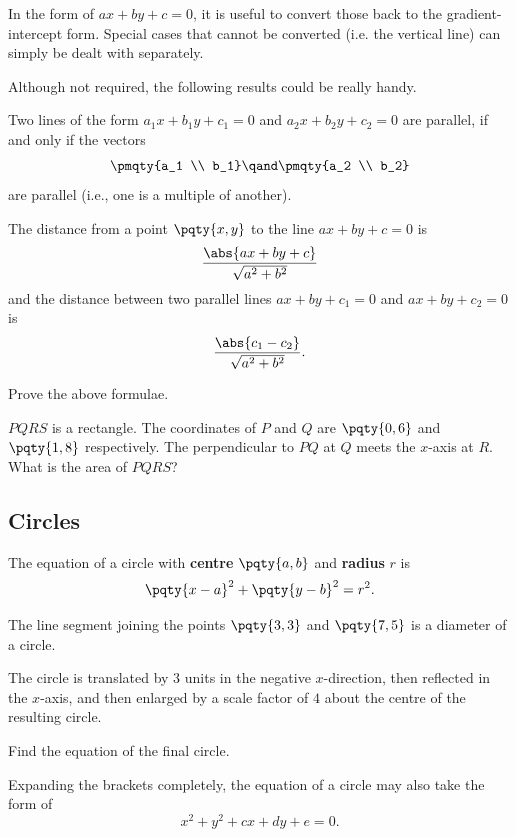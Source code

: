 \documentclass{article}
\begin{document}
In the form of \(ax + by + c = 0\), it is useful to convert those back to the gradient-intercept form. Special cases that cannot be converted (i.e. the vertical line) can simply be dealt with separately.

Although not required, the following results could be really handy.

Two lines of the form \(a_1 x + b_1 y + c_1 = 0\) and \(a_2 x + b_2 y + c_2 = 0\) are parallel, if and only if the vectors
\[
    \pmqty{a_1 \\ b_1} \qand \pmqty{a_2 \\ b_2}
\]
are parallel (i.e., one is a multiple of another).

The distance from a point \(\pqty{x, y}\) to the line \(ax + by + c = 0\) is
\[
    \frac{\abs{a x + b y + c}}{\sqrt{a^2 + b^2}}
\]
and the distance between two parallel lines \(ax + by + c_1 = 0\) and \(ax + by + c_2 = 0\) is
\[
    \frac{\abs{c_1 - c_2}}{\sqrt{a^2 + b^2}}.
\]

\begin{problem}
    Prove the above formulae.
\end{problem}

\begin{example}[TMUA 2017 P2 Q2]
    \(PQRS\) is a rectangle. The coordinates of \(P\) and \(Q\) are \(\pqty{0, 6}\) and \(\pqty{1, 8}\) respectively. The perpendicular to \(PQ\) at \(Q\) meets the \(x\)-axis at \(R\). What is the area of \(PQRS\)?
\end{example}

\subsection{Circles}

The equation of a circle with \textbf{centre} \(\pqty{a, b}\) and \textbf{radius} \(r\) is
\[
    \pqty{x - a}^2 + \pqty{y - b}^2 = r^2.
\]

\begin{example}[TMUA 2016 P1 Q9]
    The line segment joining the points \(\pqty{3, 3}\) and \(\pqty{7, 5}\) is a diameter of a circle.

    The circle is translated by \(3\) units in the negative \(x\)-direction, then reflected in the \(x\)-axis, and then enlarged by a scale factor of \(4\) about the centre of the resulting circle.

    Find the equation of the final circle.
\end{example}

Expanding the brackets completely, the equation of a circle may also take the form of
\[
    x^2 + y^2 + cx + dy + e = 0.
\]
\end{document}
